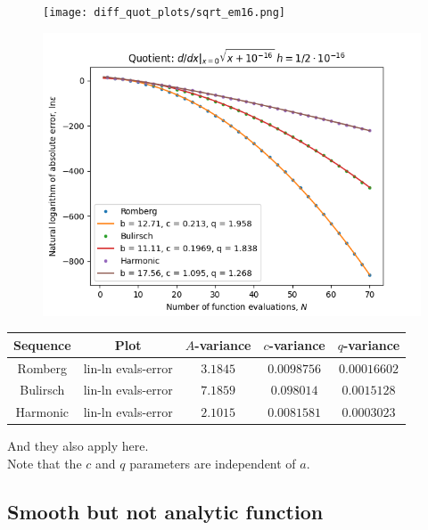 \begin{figure}[H]
\centering
\begin{minipage}{0.45\textwidth}
\centering
\texttt{[image: diff\_quot\_plots/sqrt\_em16.png]}
\end{minipage}
\begin{minipage}{0.45\textwidth}
\centering
\includegraphics[scale=0.45]{diff_quot_plots/sqrt_em16_hp_trend.png}
\end{minipage}
\end{figure}

\begin{table}[H]
    \centering
    \begin{tabular}{c|c||c|c|c}
Sequence & Plot & \(A\)-variance & \(c\)-variance & \(q\)-variance\\\hline
Romberg & lin-ln evals-error & \(3.1845\) & \(0.0098756\) & \(0.00016602\) \\
Bulirsch & lin-ln evals-error & \(7.1859\) & \(0.098014\) & \(0.0015128\) \\
Harmonic & lin-ln evals-error & \(2.1015\) & \(0.0081581\) & \(0.0003023\) \\
    \end{tabular}
    \label{tab:my_label}
\end{table}

And they also apply here.\\

Note that the \(c\) and \(q\) parameters are independent of \(a\).

\subsection{Smooth but not analytic function}

